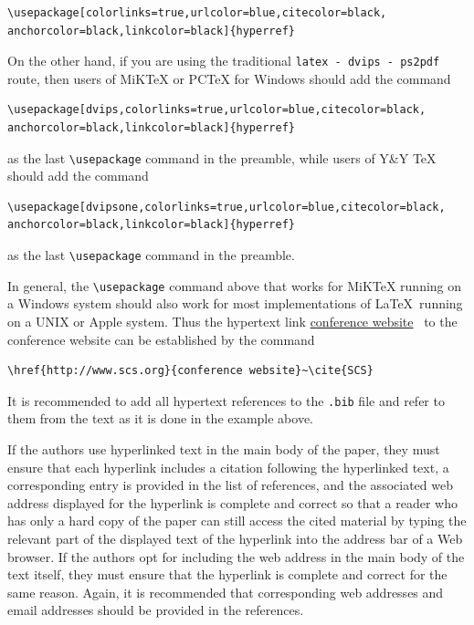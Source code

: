 \documentclass{scspaperproc}
\theoremstyle{scsthe}
\begin{document}
\begin{verbatim}
\usepackage[colorlinks=true,urlcolor=blue,citecolor=black,
anchorcolor=black,linkcolor=black]{hyperref}
\end{verbatim}

On the other hand, if you are using the traditional \texttt{latex - dvips - ps2pdf} route, then users of MiKTeX or PCTeX for Windows should add the command

\begin{verbatim}
\usepackage[dvips,colorlinks=true,urlcolor=blue,citecolor=black,
anchorcolor=black,linkcolor=black]{hyperref}
\end{verbatim}

as the last \verb+\usepackage+ command in the preamble, while users of Y\&Y TeX should add the command

\begin{verbatim}
\usepackage[dvipsone,colorlinks=true,urlcolor=blue,citecolor=black,
anchorcolor=black,linkcolor=black]{hyperref}
\end{verbatim}

as the last \verb+\usepackage+ command in the preamble.

In general, the \verb+\usepackage+ command above that works for MiKTeX running on a Windows system should also work for most implementations of \LaTeX\ running on a UNIX or Apple system.
Thus the hypertext link \href{http://www.scs.org}{conference website}~\cite{SCS} to the conference website can be established by the command

\begin{verbatim}
\href{http://www.scs.org}{conference website}~\cite{SCS}
\end{verbatim}

It is recommended to add all hypertext references to the \texttt{.bib} file and refer to them from the text as it is done in the example above.

If the authors use hyperlinked text in the main body of the paper, they must ensure that each hyperlink includes a citation following the hyperlinked text, a corresponding entry is provided in the list of references, and the associated web address displayed for the hyperlink is complete and correct so that a reader who has only a hard copy of the paper can still access the cited material by typing the relevant part of the displayed text of the hyperlink into the address bar of a Web browser. If the authors opt for including the web address in the main body of the text itself, they must ensure that the hyperlink is complete and correct for the same reason. Again, it is recommended that corresponding web addresses and email addresses should be provided in the references.
\end{document}
